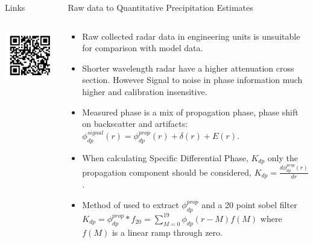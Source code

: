 \documentclass[final]{beamer}
\begin{document}
\begin{frame}{}
\begin{columns}[t]
\begin{column}{.3\linewidth}
\begin{block}{Links}
\begin{columns}[c]
\begin{column}{.2\linewidth}
		 		\includegraphics[width=.9\linewidth]{figures/git_repo_qr}\\[1ex]   
        		 	\end{column}
         	\end{columns}
         \end{block}

  		

    \end{column}
      \begin{column}{.3\linewidth}
  \vfill
 
     \begin{block}{Raw data to Quantitative Precipitation Estimates}
 	\begin{columns}[t]
		\begin{column}{.38\linewidth}
		\begin{itemize}
		\item Raw collected radar data in engineering units is unsuitable for comparison with model data. 
		\item Shorter wavelength radar have a higher attenuation cross section. However Signal to noise in phase information much higher and calibration insensitive.
		\item Measured phase is a mix of propagation phase, phase shift on backscatter and artifacts: {\tiny $\phi_{dp}^{signal}(r) = \phi_{dp}^{prop}(r) + \delta(r) + E(r)$}.
		\item When calculating Specific Differential Phase, {\small $K_{dp}$} only the propagation component should be considered, {\tiny $K_{dp} = \frac{d\phi_{dp}^{prop}(r)}{dr}$}.
		\item Method of \citet{giangrande_application_2013} used to extract {\small $\phi_{dp}^{prop}$} and a 20 point sobel filter 
		{\tiny$K_{dp} = \phi_{dp}^{prop} \ast f_{20} = \sum\limits_{M=0}^{19}   \phi_{dp}(r-M)f(M)$} where $f(M)$ is a linear ramp through zero. 
		

\end{itemize}
\end{column}
\end{columns}
\end{block}
\end{column}
\end{columns}
\end{frame}
\end{document}
